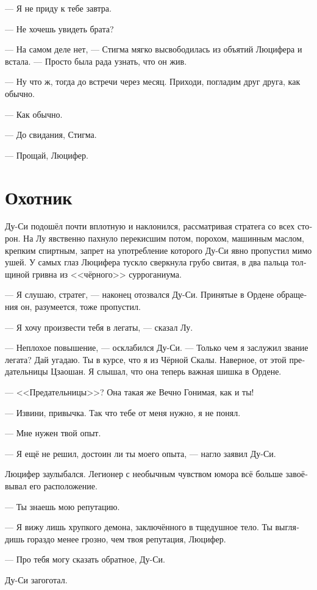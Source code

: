 \documentclass[a4paper,12pt,fleqn]{book}\usepackage{cooltooltips}\usepackage{polyglossia}\setdefaultlanguage[babelshorthands=true]{russian}\setotherlanguage{english}\defaultfontfeatures{Ligatures=TeX,Mapping=tex-text} \usepackage{xcolor}\definecolor{lightgray}{HTML}{bbbbbb}\color{lightgray}\newcommand{\ml}[3]{\textenglish{\textcolor{black}{#3}}}
\begin{document}
{--- Я не приду к тебе завтра.

--- Не хочешь увидеть брата?

--- На самом деле нет, --- Стигма мягко высвободилась из объятий Люцифера и встала.
--- Просто была рада узнать, что он жив.

--- Ну что ж, тогда до встречи через месяц.
Приходи, погладим друг друга, как обычно.

--- Как обычно.

--- До свидания, Стигма.

--- Прощай, Люцифер.

\section{Охотник}

Ду-Си подошёл почти вплотную и наклонился, рассматривая стратега со всех сторон.
На Лу явственно пахнуло перекисшим потом, порохом, машинным маслом, крепким спиртным, запрет на употребление которого Ду-Си явно пропустил мимо ушей.
У самых глаз Люцифера тускло сверкнула грубо свитая, в два пальца толщиной гривна из <<чёрного>> сурроганиума.

--- Я слушаю, стратег, --- наконец отозвался Ду-Си.
Принятые в Ордене обращения он, разумеется, тоже пропустил.

--- Я хочу произвести тебя в легаты, --- сказал Лу.

--- Неплохое повышение, --- осклабился Ду-Си.
--- Только чем я заслужил звание легата?
Дай угадаю.
Ты в курсе, что я из Чёрной Скалы.
Наверное, от этой предательницы Цзаошан.
Я слышал, что она теперь важная шишка в Ордене.

--- <<Предательницы>>?
Она такая же Вечно Гонимая, как и ты!

--- Извини, привычка.
Так что тебе от меня нужно, я не понял.

--- Мне нужен твой опыт.

--- Я ещё не решил, достоин ли ты моего опыта, --- нагло заявил Ду-Си.

Люцифер заулыбался.
Легионер с необычным чувством юмора всё больше завоёвывал его расположение.

--- Ты знаешь мою репутацию.

--- Я вижу лишь хрупкого демона, заключённого в тщедушное тело.
Ты выглядишь гораздо менее грозно, чем твоя репутация, Люцифер.

--- Про тебя могу сказать обратное, Ду-Си.

Ду-Си загоготал.

}
\end{document}

